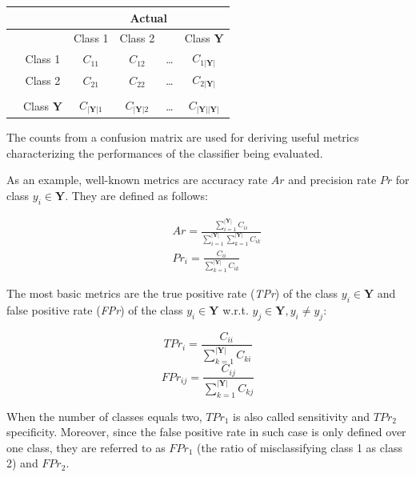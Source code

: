\begin{table}[h]
\centering                            %
\begin{tabular}{|l| c| c c c c|}              %
\hline                                %
& & \multicolumn{4}{|c|}{Actual} \\
\hline 
& & Class 1 & Class 2 & & Class $\mathbf{Y}$ \\ [0.5ex]
\hline                                      %
& Class 1 & $C_{11}$ & $C_{12}$ & \ldots & $C_{1|\mathbf{Y}|}$ \\
& Class 2  & $C_{21}$  &  $C_{22}$  & \ldots & $C_{2|\mathbf{Y}|}$ \\
\raisebox{1.5ex}{Predicted}  & & \raisebox{1.5ex}{\ldots} & \raisebox{1.5ex}{\ldots}  & & \raisebox{1.5ex}{\ldots} \\
& Class $\mathbf{Y}$ &  $C_{|\mathbf{Y}|1}$ & $C_{|\mathbf{Y}|2}$ & \ldots & $C_{|\mathbf{Y}||\mathbf{Y}|}$ \\
\hline                          %
\end{tabular}
\label{matrix:fig}
\end{table}

 
The counts from a confusion matrix are used for deriving useful metrics characterizing the performances of the classifier being evaluated. 

As an example, well-known metrics are accuracy rate $Ar$  and precision rate $Pr$  for class $y_i \in \mathbf{Y}$. They are
defined as follows:

\begin{eqnarray}
&&Ar = \frac{\sum_{i =1}^{|\mathbf{Y}|}C_{ii}}{\sum_{i =1}^{|\mathbf{Y}|}\sum_{k=1}^{|\mathbf{Y}|} C_{ik}} \label{a}\\
&&Pr_i = \frac{ C_{ii}}{\sum_{k=1}^{|\mathbf{Y}|} C_{ik}}  \label{p}
\end{eqnarray}

The most basic metrics are the true positive rate ({\it TPr}) of the class $y_i \in \mathbf{Y}$  and false positive rate ({\it FPr}) of the class $y_i \in \mathbf{Y}$ w.r.t. $y_j \in \mathbf{Y}, y_i \neq y_j$:


{\small
\[ TPr_i = \frac{C_{ii}}{\sum_{k=1}^{|\mathbf{Y}|} C_{ki}}\]
\[ FPr_{ij} = \frac{C_{ij}}{\sum_{k=1}^{|\mathbf{Y}|} C_{kj}}\]
}

 When the number of classes equals two, $TPr_1$ is also called sensitivity and $TPr_2$ specificity. Moreover, since the false positive rate in such case is only defined over one class, they are referred to as $FPr_1$ (the ratio of misclassifying class 1 as class 2) and $FPr_2$.

